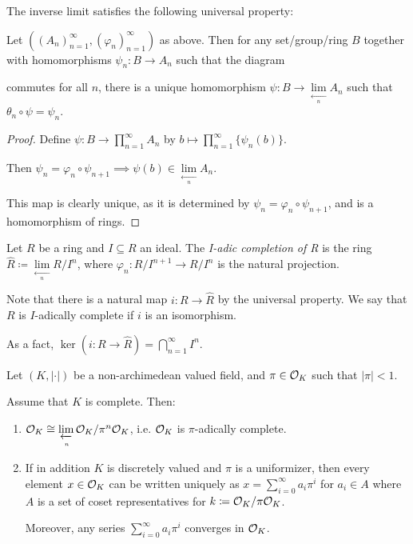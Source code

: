\documentclass[10pt,a4paper]{article}
\begin{document}
The inverse limit satisfies the following universal property:
\begin{proposition}
  Let $((A_n)_{n=1}^\infty, (\varphi_n)_{n=1}^\infty)$ as above. Then for any set/group/ring $B$ together with homomorphisms $\psi_n : B \to A_n$ such that the diagram
   commutes for all $n$, there is a unique homomorphism $\psi: B \to \lim\limits_{\xleftarrow[n]{}} A_n$ such that $\theta_n \circ \psi = \psi_n$.
\end{proposition}

\begin{proof}
  Define $\psi: B \to \prod_{n=1}^\infty A_n$ by $b \mapsto \prod_{n=1}^\infty \{\psi_n(b)\}$.

  Then $\psi_n = \varphi_n \circ \psi_{n+1} \implies \psi(b) \in \lim\limits_{\xleftarrow[n]{}} A_n$.

  This map is clearly unique, as it is determined by $\psi_n = \varphi_n \circ \psi_{n+1}$, and is a homomorphism of rings.
\end{proof}

\begin{definition}
  Let $R$ be a ring and $I \subseteq R$ an ideal. The \emph{I-adic completion of R} is the ring $\hat{R} \coloneqq \lim\limits_{\xleftarrow[n]{}} R/I^n$, where $\varphi_n : R/I^{n+1} \to R/I^n$ is the natural projection.
\end{definition}

Note that there is a natural map $i:R \to \hat{R}$ by the universal property. We say that $R$ is $I$-adically complete if $i$ is an isomorphism.

As a fact, $\ker(i: R \to \hat{R}) = \bigcap_{n=1}^\infty I^n$.

Let $(K, |\cdot|)$ be a non-archimedean valued field, and $\pi \in \mathcal{O}_K$ such that $|\pi| < 1$.
\begin{proposition}
  Assume that $K$ is complete. Then:
  \begin{enumerate}
    \item $\mathcal{O}_K \cong \lim\limits_{\xleftarrow[n]{}} \mathcal{O}_K/\pi^n\mathcal{O}_K$, i.e. $\mathcal{O}_K$ is $\pi$-adically complete.
    \item If in addition $K$ is discretely valued and $\pi$ is a uniformizer, then every element $x \in \mathcal{O}_K$ can be written uniquely as $x = \sum_{i=0}^\infty a_i \pi^i$ for $a_i \in A$ where $A$ is a set of coset representatives for $k\coloneqq \mathcal{O}_K/\pi\mathcal{O}_K$.

    Moreover, any series $\sum_{i=0}^\infty a_i \pi^i$ converges in $\mathcal{O}_K$.
  \end{enumerate}
\end{proposition}
\end{document}
